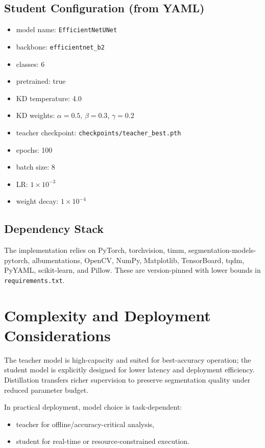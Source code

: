 \documentclass[journal]{IEEEtran}
\begin{document}
\subsection{Student Configuration (from YAML)}
\begin{itemize}
    \item model name: \texttt{EfficientNetUNet}
    \item backbone: \texttt{efficientnet\_b2}
    \item classes: 6
    \item pretrained: true
    \item KD temperature: 4.0
    \item KD weights: $\alpha=0.5$, $\beta=0.3$, $\gamma=0.2$
    \item teacher checkpoint: \texttt{checkpoints/teacher\_best.pth}
    \item epochs: 100
    \item batch size: 8
    \item LR: $1\times10^{-3}$
    \item weight decay: $1\times10^{-4}$
\end{itemize}

\subsection{Dependency Stack}
The implementation relies on PyTorch, torchvision, timm, segmentation-models-pytorch, albumentations, OpenCV, NumPy, Matplotlib, TensorBoard, tqdm, PyYAML, scikit-learn, and Pillow. These are version-pinned with lower bounds in \texttt{requirements.txt}.

\section{Complexity and Deployment Considerations}
The teacher model is high-capacity and suited for best-accuracy operation; the student model is explicitly designed for lower latency and deployment efficiency. Distillation transfers richer supervision to preserve segmentation quality under reduced parameter budget.

In practical deployment, model choice is task-dependent:
\begin{itemize}
    \item teacher for offline/accuracy-critical analysis,
    \item student for real-time or resource-constrained execution.
\end{itemize}
\end{document}

